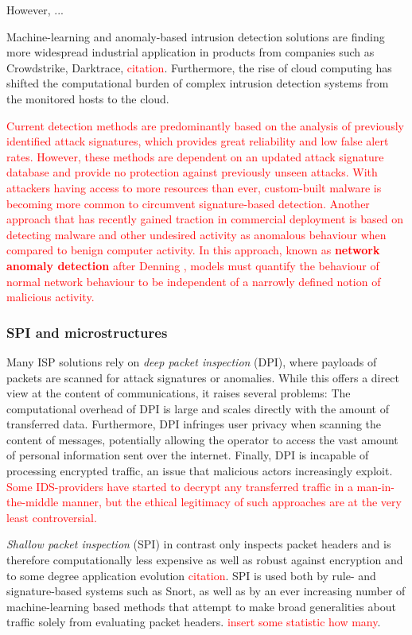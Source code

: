 However, ...

Machine-learning and anomaly-based intrusion detection solutions are finding more widespread industrial application in products from companies such as Crowdstrike, Darktrace, \textcolor{red}{citation}. Furthermore, the rise of cloud computing has shifted the computational burden of complex intrusion detection systems from the monitored hosts to the cloud.

\textcolor{red}{Current detection methods are predominantly based on the analysis of previously identified attack signatures, which provides great reliability and low false alert rates. However, these methods are dependent on an updated attack signature database and provide no protection against previously unseen attacks. With attackers having access to more resources than ever, custom-built malware is becoming more common to circumvent signature-based detection. 
Another approach that has recently gained traction in commercial deployment is based on detecting malware and other undesired activity as anomalous behaviour when compared to benign computer activity. In this approach, known as \textbf{network anomaly detection} after Denning \cite{denning1987intrusion}, models must quantify the behaviour of normal network behaviour to be independent of a narrowly defined notion of malicious activity.
}


\subsubsection{SPI and microstructures}

Many ISP solutions rely on \emph{deep packet inspection} (DPI), where payloads of packets are scanned for attack signatures or anomalies. While this offers a direct view at the content of communications, it raises several problems: The computational overhead of DPI is large and scales directly with the amount of transferred data. Furthermore, DPI infringes user privacy when scanning the content of messages, potentially allowing the operator to access the vast amount of personal information sent over the internet. Finally, DPI is incapable of processing encrypted traffic, an issue that malicious actors increasingly exploit. \textcolor{red}{Some IDS-providers have started to decrypt any transferred traffic in a man-in-the-middle manner, but the ethical legitimacy of such approaches are at the very least controversial.}

\emph{Shallow packet inspection} (SPI) in contrast only inspects packet headers and is therefore computationally less expensive as well as robust against encryption and to some degree application evolution \textcolor{red}{citation}. SPI is used both by rule- and signature-based systems such as Snort, as well as by an ever increasing number of machine-learning based methods that attempt to make broad generalities about traffic solely from evaluating packet headers. \textcolor{red}{insert some statistic how many}.

